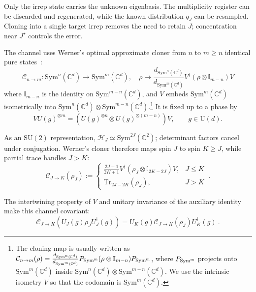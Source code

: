 \documentclass[a4paper,onecolumn,11pt]{quantumarticle}
\def\h{\mathcal{H}}
\def\id{\mathbb{I}}
\newcommand*{\Tr}{\mathrm{Tr}}
\begin{document}
Only the irrep state carries the unknown eigenbasis. The multiplicity
register can be discarded and regenerated, while the known distribution
$q_J$ can be resampled. Cloning into a single target irrep removes the
need to retain $J$; concentration near $J^\star$ controls the error.

The channel uses Werner's optimal approximate cloner from $n$ to
$m\ge n$ identical pure states~\cite{werner1998optimal}:
\begin{equation}\label{eq:werner}
    \mathcal{C}_{n \to m}:\mathrm{Sym}^n(\mathbb{C}^d)\to\mathrm{Sym}^m(\mathbb{C}^d),\quad \rho\mapsto \frac{d_{\mathrm{Sym}^n(\mathbb{C}^d)}}{d_{\mathrm{Sym}^m(\mathbb{C}^d)}}V^\dagger(\rho\otimes \id_{m-n})V
\end{equation}
where $\id_{m-n}$ is the identity on $\mathrm{Sym}^{m-n}(\mathbb{C}^d)$, and $V$ embeds $\mathrm{Sym}^m(\mathbb{C}^d)$ isometrically into $\mathrm{Sym}^n(\mathbb{C}^d)\otimes \mathrm{Sym}^{m-n}(\mathbb{C}^d)$.\footnote{The cloning map is usually written as $\mathcal{C}_{n \to m}(\rho) = \frac{d_{\mathrm{Sym}^n(\mathbb{C}^d)}}{d_{\mathrm{Sym}^m(\mathbb{C}^d)}}P_{\rm{Sym}^m}(\rho\otimes \id_{m-n})P_{\rm{Sym}^m}$, where $P_{\rm{Sym}^m}$ projects onto $\mathrm{Sym}^m(\mathbb{C}^d)$ inside $\mathrm{Sym}^n(\mathbb{C}^d)\otimes \mathrm{Sym}^{m-n}(\mathbb{C}^d)$. We use the intrinsic isometry $V$ so that the codomain is $\mathrm{Sym}^m(\mathbb{C}^d)$.} It is fixed up to a phase by
\begin{equation}
V U(g)^{\otimes m}
=(U(g)^{\otimes n}\otimes U(g)^{\otimes(m-n)})V,
\qquad g\in\mathrm U(d).
\end{equation}

As an $\mathrm{SU}(2)$ representation,
$\h_J\simeq\mathrm{Sym}^{2J}(\mathbb C^2)$; determinant factors
cancel under conjugation. Werner's cloner therefore maps spin $J$
to spin $K\ge J$, while partial trace handles $J>K$:
\begin{equation}\label{eq:qubitcloning}
    \mathcal{C}_{J\to K}(\rho_J) :=  \begin{cases} 
        \frac{2J+1}{2K+1} V^\dagger(\rho_J \otimes \id_{2K-2J})V, & J \le K \\ 
        \Tr_{2J-2K}(\rho_J), & J > K
    \end{cases}\ .
\end{equation}

The intertwining property of $V$ and unitary invariance of the
auxiliary identity make this channel covariant:
\begin{equation}
    \mathcal{C}_{J\to K}\left(U_J(g) \rho_J U_J^\dagger(g)\right) = U_K(g) \mathcal{C}_{J\to K}(\rho_J) U_K^\dagger(g)\ .
\end{equation}
\end{document}
